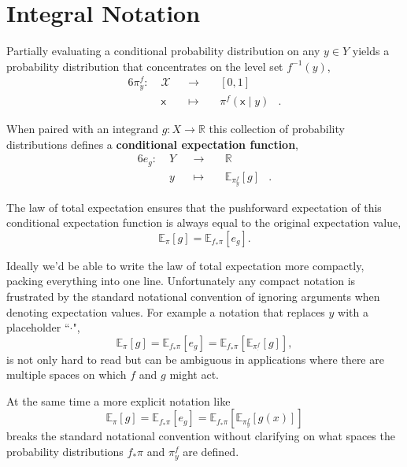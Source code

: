 \documentclass[11pt, oneside]{article}
\newcommand{\E}[2]{
  \ensuremath{ \mathbb{E}_{#1} \! \left[ #2 \right] }
}
\begin{document}
\section{Integral Notation}

Partially evaluating a conditional probability distribution on any $y \in Y$ 
yields a probability distribution that concentrates on the level set 
$f^{-1}(y)$,
%
\begin{alignat*}{6}
\pi^{f}_{y} :\; &\mathcal{X}& &\rightarrow& \; &[0, 1]&
\\
&\mathsf{x}& &\mapsto& &\pi^{f}( \mathsf{x} \mid y )&.
\end{alignat*}

When paired with an integrand $g : X \rightarrow \mathbb{R}$ this collection 
of probability distributions defines a \textbf{conditional expectation function},
%
\begin{alignat*}{6}
e_{g} : \; &Y& &\rightarrow& \; &\mathbb{R}&
\\
&y& &\mapsto& & \E{ \pi^{f}_{y} }{ g }&.
\end{alignat*}

The law of total expectation ensures that the pushforward expectation of this 
conditional expectation function is always equal to the original expectation 
value,
%
\begin{equation*}
\E{\pi}{g} = \E{ f_{*} \pi }{e_{g}}.
\end{equation*}

Ideally we'd be able to write the law of total expectation more compactly,
packing everything into one line.  Unfortunately any compact notation is 
frustrated by the standard notational convention of ignoring arguments when 
denoting expectation values.  For example a notation that replaces $y$ with 
a placeholder ``$\cdot$",
%
\begin{equation*}
\E{\pi}{g} = \E{ f_{*} \pi }{e_{g}} = \E{ f_{*} \pi }{ \E{\pi^{f}_{\cdot}}{g} },
\end{equation*}
%
is not only hard to read but can be ambiguous in applications where there 
are multiple spaces on which $f$ and $g$ might act.

At the same time a more explicit notation like
%
\begin{equation*}
\E{\pi}{g} = \E{ f_{*} \pi }{e_{g}} = \E{ f_{*} \pi }{ \E{\pi^{f}_{y}}{g(x)} }
\end{equation*}
%
breaks the standard notational convention without clarifying on what spaces 
the probability distributions $f_{*} \pi$ and $\pi^{f}_{y}$ are defined.
\end{document}
